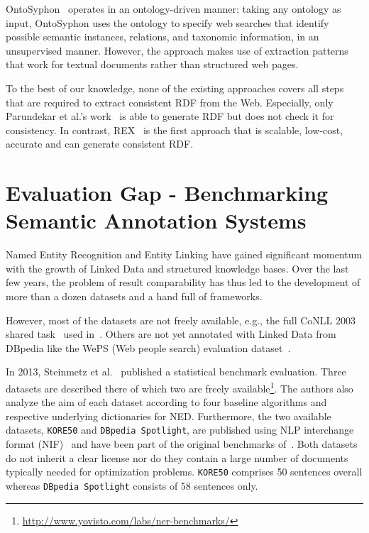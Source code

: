 OntoSyphon~\cite{DBLP:journals/ws/McDowellC08} operates in an ontology-driven manner: taking any ontology as input, OntoSyphon uses the ontology to specify web searches that identify possible semantic instances, relations, and taxonomic information, in an unsupervised manner. However, the approach makes use of extraction patterns that work for textual documents rather than structured web pages.

To the best of our knowledge, none of the existing approaches covers all steps that are required to extract consistent \ac{RDF} from the Web. 
Especially, only Parundekar et al.'s work~\cite{conf/aaaiss/ParundekarKA10} is able to generate \ac{RDF} but does not check it for consistency.
In contrast, REX~\cite{rex} is the first approach that is scalable, low-cost, accurate and can generate consistent \ac{RDF}. 




\section{Evaluation Gap - Benchmarking Semantic Annotation Systems}

Named Entity Recognition and Entity Linking have gained significant momentum with the growth of Linked Data and structured knowledge bases. 
Over the last few years, the problem of result comparability has thus led to the development of more than a dozen datasets and a hand full of frameworks.
\bigskip

However, most of the datasets are not freely available, e.g., the full CoNLL 2003 shared task~\cite{conll2003} used in~\cite{AIDA}.
Others are not yet annotated with Linked Data from DBpedia like the WePS (Web people search) evaluation dataset~\cite{WEPS}.

In 2013, Steinmetz et al.~\cite{NEDstatBench} published a statistical benchmark evaluation.
Three datasets are described there of which two are freely available\footnote{\url{http://www.yovisto.com/labs/ner-benchmarks/}}.
The authors also analyze the aim of each dataset according to four baseline algorithms and respective underlying dictionaries for NED.
Furthermore, the two available datasets, \texttt{KORE50} and \texttt{DBpedia Spotlight}, are published using NLP interchange format (NIF)~\cite{ISWC2013NIF} and have been part of the original benchmarks of~\cite{AIDA,spotlight}. 
Both datasets do not inherit a clear license nor do they contain a large number of documents typically needed for optimization problems.
\texttt{KORE50} comprises 50 sentences overall whereas \texttt{DBpedia Spotlight} consists of 58 sentences only. 

